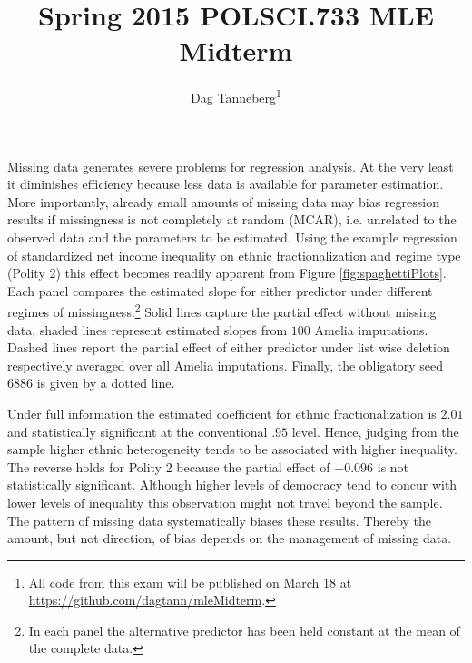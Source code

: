 \documentclass{scrartcl}\usepackage[]{graphicx}\usepackage[]{color}
\title{Spring 2015 POLSCI.733 MLE Midterm}
\author{Dag Tanneberg\thanks{%
    All code from this exam will be
    published on March 18 at
    \url{https://github.com/dagtann/mleMidterm}.%
  }
}
\date{}
\begin{document}
 





\maketitle 
\thispagestyle{scrheadings} 

Missing data generates severe problems for regression
analysis. At the very least it diminishes efficiency because
less data is available for parameter estimation. More
importantly, already small amounts of missing data may bias
regression results if missingness is not completely at
random (MCAR), i.e. unrelated to the observed data and the
parameters to be estimated. Using the example regression of
standardized net income inequality on ethnic
fractionalization and regime type (Polity 2) this effect
becomes readily apparent from Figure
\ref{fig:spaghettiPlots}. Each panel compares the estimated
slope for either predictor under different regimes of
missingness.\footnote{In each panel the alternative
predictor has been held constant at the mean of the complete
data.} Solid lines capture the partial effect without
missing data, shaded lines represent estimated slopes from
$100$ Amelia  imputations. Dashed lines report the partial
effect of either  predictor under list wise deletion
respectively averaged over all Amelia imputations. Finally,
the obligatory seed $6886$ is given by a dotted line.


Under full information the estimated coefficient for ethnic
fractionalization is $2.01$ and statistically significant at
the conventional $.95$ level. Hence, judging from the sample
higher ethnic heterogeneity tends to be associated with
higher inequality. The reverse holds for Polity 2 because
the partial effect of $-0.096$ is not statistically
significant. Although higher levels of democracy tend to
concur with lower levels of inequality this observation
might not travel beyond the sample. The pattern of missing
data systematically biases these results. Thereby the
amount, but not direction, of bias depends on the management
of missing data.
\end{document}
